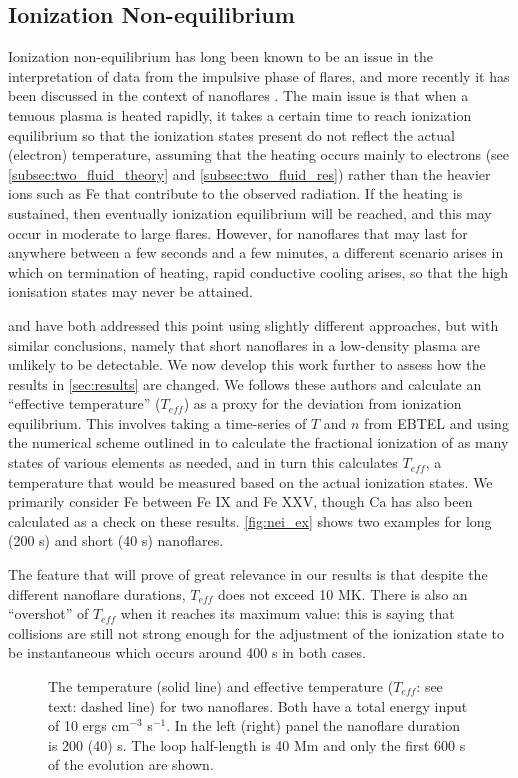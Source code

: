 \documentclass[apj]{emulateapj}
\begin{document}
	\subsection{Ionization Non-equilibrium}
	\label{subsec:nei_theory}
	\par Ionization non-equilibrium has long been known to be an issue in the interpretation of data from the impulsive phase of flares, and more recently it has been discussed in the context of nanoflares \citep{bradshaw_explosive_2006,reale_nonequilibrium_2008}. The main issue is that when a tenuous plasma is heated rapidly, it takes a certain time to reach ionization equilibrium so that the ionization states present do not reflect the actual (electron) temperature, assuming that the heating occurs mainly to electrons (see \autoref{subsec:two_fluid_theory} and \autoref{subsec:two_fluid_res}) rather than the heavier ions such as Fe that contribute to the observed radiation. If the heating is sustained, then eventually ionization equilibrium will be reached, and this may occur in moderate to large flares. However, for nanoflares that may last for anywhere between a few seconds and a few minutes, a different scenario arises in which on termination of heating, rapid conductive cooling arises, so that the high ionisation states may never be attained.
	\par \citet{reale_nonequilibrium_2008} and \citet{bradshaw_numerical_2009} have both addressed this point using slightly different approaches, but with similar conclusions, namely that short nanoflares in a low-density plasma are unlikely to be detectable. We now develop this work further to assess how the results in \ref{sec:results} are changed. We follows these authors and calculate an ``effective temperature'' ($T_{eff}$) as a proxy for the deviation from ionization equilibrium. This involves taking a time-series of $T$ and $n$ from EBTEL and using the numerical scheme outlined in \citet{bradshaw_numerical_2009} to calculate the fractional ionization of as many states of various elements as needed, and in turn this calculates $T_{eff}$, a temperature that would be measured based on the actual ionization states. We primarily consider Fe between Fe IX and Fe XXV, though Ca has also been calculated as a check on these results. \autoref{fig:nei_ex} shows two examples for long (200 s) and short (40 s) nanoflares.
	\par The feature that will prove of great relevance in our results is that despite the different nanoflare durations, $T_{eff}$ does not exceed 10 MK. There is also an ``overshot'' of $T_{eff}$ when it reaches its maximum value: this is saying that collisions are still not strong enough for the adjustment of the ionization state to be instantaneous which occurs around 400 s in both cases.
	\begin{figure}
		\centering
		\caption{The temperature (solid line) and effective temperature ($T_{eff}$: see text: dashed line) for two nanoflares. Both have a total energy input of 10 ergs cm$^{-3}$ s$^{-1}$. In the left (right) panel the nanoflare duration is 200 (40) s. The loop half-length is 40 Mm and only the first 600 s of the evolution are shown.}
		\label{fig:nei_ex}
	\end{figure}
\end{document}
